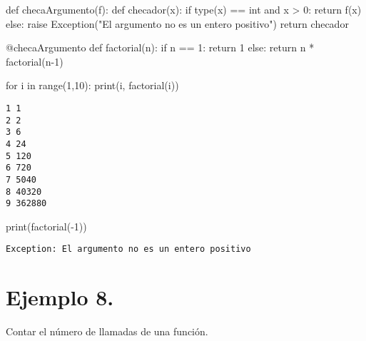 \documentclass[
  letterpaper,
  DIV=11,
  numbers=noendperiod]{scrreprt}
\newenvironment{Shaded}{\begin{snugshade}}{\end{snugshade}}
\newcommand{\AttributeTok}[1]{\textcolor[rgb]{0.40,0.45,0.13}{#1}}
\newcommand{\BuiltInTok}[1]{\textcolor[rgb]{0.00,0.23,0.31}{#1}}
\newcommand{\ControlFlowTok}[1]{\textcolor[rgb]{0.00,0.23,0.31}{#1}}
\newcommand{\DecValTok}[1]{\textcolor[rgb]{0.68,0.00,0.00}{#1}}
\newcommand{\KeywordTok}[1]{\textcolor[rgb]{0.00,0.23,0.31}{#1}}
\newcommand{\NormalTok}[1]{\textcolor[rgb]{0.00,0.23,0.31}{#1}}
\newcommand{\OperatorTok}[1]{\textcolor[rgb]{0.37,0.37,0.37}{#1}}
\newcommand{\PreprocessorTok}[1]{\textcolor[rgb]{0.68,0.00,0.00}{#1}}
\newcommand{\StringTok}[1]{\textcolor[rgb]{0.13,0.47,0.30}{#1}}
\begin{document}
\begin{Shaded}
\begin{Highlighting}[]
\KeywordTok{def}\NormalTok{ checaArgumento(f):}
    \KeywordTok{def}\NormalTok{ checador(x):}
        \ControlFlowTok{if} \BuiltInTok{type}\NormalTok{(x) }\OperatorTok{==} \BuiltInTok{int} \KeywordTok{and}\NormalTok{ x }\OperatorTok{\textgreater{}} \DecValTok{0}\NormalTok{:}
            \ControlFlowTok{return}\NormalTok{ f(x)}
        \ControlFlowTok{else}\NormalTok{:}
            \ControlFlowTok{raise} \PreprocessorTok{Exception}\NormalTok{(}\StringTok{"El argumento no es un entero positivo"}\NormalTok{)}
    \ControlFlowTok{return}\NormalTok{ checador}

\AttributeTok{@checaArgumento}
\KeywordTok{def}\NormalTok{ factorial(n):}
    \ControlFlowTok{if}\NormalTok{ n }\OperatorTok{==} \DecValTok{1}\NormalTok{:}
        \ControlFlowTok{return} \DecValTok{1}
    \ControlFlowTok{else}\NormalTok{:}
        \ControlFlowTok{return}\NormalTok{ n }\OperatorTok{*}\NormalTok{ factorial(n}\OperatorTok{{-}}\DecValTok{1}\NormalTok{)}
    
\ControlFlowTok{for}\NormalTok{ i }\KeywordTok{in} \BuiltInTok{range}\NormalTok{(}\DecValTok{1}\NormalTok{,}\DecValTok{10}\NormalTok{):}
    \BuiltInTok{print}\NormalTok{(i, factorial(i))}
\end{Highlighting}
\end{Shaded}

\begin{verbatim}
1 1
2 2
3 6
4 24
5 120
6 720
7 5040
8 40320
9 362880
\end{verbatim}

\begin{Shaded}
\begin{Highlighting}[]
\BuiltInTok{print}\NormalTok{(factorial(}\OperatorTok{{-}}\DecValTok{1}\NormalTok{))}
\end{Highlighting}
\end{Shaded}

\begin{verbatim}
Exception: El argumento no es un entero positivo
\end{verbatim}

\section{\texorpdfstring{\textbf{Ejemplo
8.}}{Ejemplo 8.}}\label{ejemplo-8.-2}

Contar el número de llamadas de una función.
\end{document}

